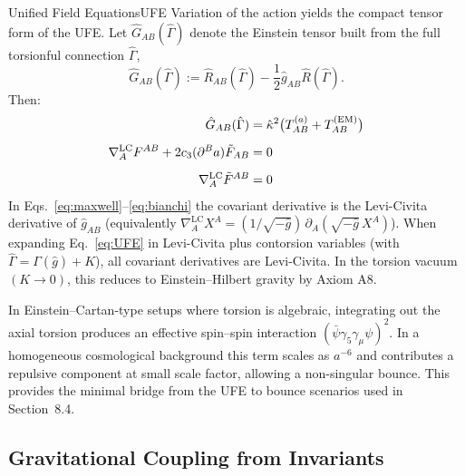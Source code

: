 \begin{theorem}{Unified Field Equations}{UFE}
Variation of the action yields the compact tensor form of the UFE. Let $\hat{G}_{AB}(\hat{\Gamma})$ denote the Einstein tensor built from the full torsionful connection $\hat{\Gamma}$,
\begin{equation*}
    \hat{G}_{AB}(\hat{\Gamma}) := \hat{R}_{AB}(\hat{\Gamma}) - \frac{1}{2}\hat{g}_{AB}\hat{R}(\hat{\Gamma}).
\end{equation*}
Then:
\begin{align}
    \hat{G}_{AB}(\hat{\Gamma})
        &= \hat{\kappa}^2\bigl(T^{(a)}_{AB} + T^{(\text{EM})}_{AB}\bigr)
        \label{eq:UFE}\\[0.5em]
    \nabla^{\mathrm{LC}}_A F^{AB} + 2c_3(\partial^B a)\tilde{F}_{AB} &= 0
        \label{eq:maxwell}\\[0.5em]
    \nabla^{\mathrm{LC}}_A\tilde{F}^{AB} &= 0
        \label{eq:bianchi}
\end{align}
In Eqs.~\eqref{eq:maxwell}--\eqref{eq:bianchi} the covariant derivative is the Levi-Civita derivative of $\hat{g}_{AB}$ (equivalently $\nabla^{\mathrm{LC}}_A X^A=(1/\sqrt{-\hat{g}})\,\partial_A(\sqrt{-\hat{g}}\,X^A)$).
When expanding Eq.~\eqref{eq:UFE} in Levi-Civita plus contorsion variables (with $\hat{\Gamma}=\Gamma(\hat{g})+K$), all covariant derivatives are Levi-Civita.
In the torsion vacuum $(K \to 0)$, this reduces to Einstein--Hilbert gravity 
by Axiom A8.
\end{theorem}

\begin{tcolorbox}[colback=blue!3, colframe=blue!40,
    title={\textbf{Lemma (Torsion-Induced Bounce Term)}}, fonttitle=\bfseries\small]
In Einstein--Cartan-type setups where torsion is algebraic, integrating out the
axial torsion produces an effective spin--spin interaction
$(\bar{\psi}\gamma_5\gamma_\mu\psi)^2$. In a homogeneous cosmological background this term
scales as $a^{-6}$ and contributes a repulsive component at small scale factor,
allowing a non-singular bounce. This provides the minimal bridge from the UFE to
bounce scenarios used in Section~8.4.
\end{tcolorbox}

\subsection{Gravitational Coupling from Invariants}

